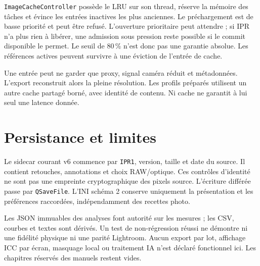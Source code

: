 \texttt{ImageCacheController} possède le LRU sur son thread, réserve la
mémoire des tâches et évince les entrées inactives les plus anciennes.
Le préchargement est de basse priorité et peut être refusé. L'ouverture
prioritaire peut attendre ; si IPR n'a plus rien à libérer, une admission sous
pression reste possible si le commit disponible le permet. Le seuil de
80\,\% n'est donc pas une garantie absolue. Les références actives peuvent
survivre à une éviction de l'entrée de cache.

Une entrée peut ne garder que proxy, signal caméra réduit et métadonnées.
L'export reconstruit alors la pleine résolution. Les profils préparés utilisent
un autre cache partagé borné, avec identité de contenu. Ni cache ne garantit
à lui seul une latence donnée.

\section{Persistance et limites}
Le sidecar courant v6 commence par \texttt{IPR1}, version, taille et date du
source. Il contient retouches, annotations et choix RAW/optique. Ces contrôles
d'identité ne sont pas une empreinte cryptographique des pixels source.
L'écriture différée passe par \texttt{QSaveFile}. L'INI schéma 2 conserve
uniquement la présentation et les préférences raccordées, indépendamment
des recettes photo.

Les JSON immuables des analyses font autorité sur les mesures ; les CSV,
courbes et textes sont dérivés. Un test de non-régression réussi ne démontre
ni une fidélité physique ni une parité Lightroom. Aucun export par lot,
affichage ICC par écran, masquage local ou traitement IA n'est déclaré
fonctionnel ici. Les chapitres réservés des manuels restent vides.



